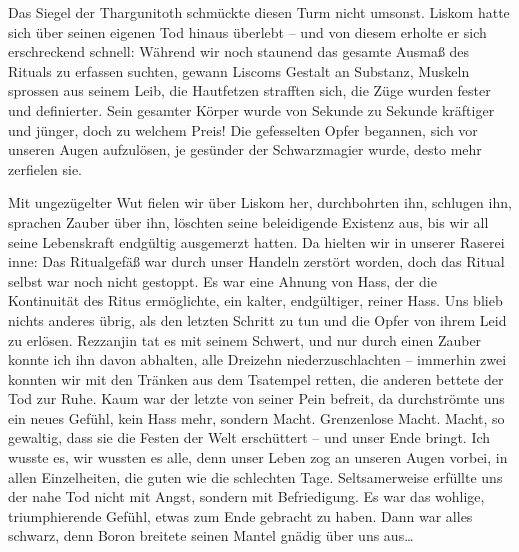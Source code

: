 Das Siegel der Thargunitoth schmückte diesen Turm nicht umsonst. Liskom hatte sich über seinen eigenen Tod hinaus überlebt -- und von diesem erholte er sich erschreckend schnell: Während wir noch staunend das gesamte Ausmaß des Rituals zu erfassen suchten, gewann Liscoms Gestalt an Substanz, Muskeln sprossen aus seinem Leib, die Hautfetzen strafften sich, die Züge wurden fester und definierter. Sein gesamter Körper wurde von Sekunde zu Sekunde kräftiger und jünger, doch zu welchem Preis! Die gefesselten Opfer begannen, sich vor unseren Augen aufzulösen, je gesünder der Schwarzmagier wurde, desto mehr zerfielen sie. \par

Mit ungezügelter Wut fielen wir über Liskom her, durchbohrten ihn, schlugen ihn, sprachen Zauber über ihn, löschten seine beleidigende Existenz aus, bis wir all seine Lebenskraft endgültig ausgemerzt hatten. Da hielten wir in unserer Raserei inne: Das Ritualgefäß war durch unser Handeln zerstört worden, doch das Ritual selbst war noch nicht gestoppt. Es war eine Ahnung von Hass, der die Kontinuität des Ritus ermöglichte, ein kalter, endgültiger, reiner Hass. Uns blieb nichts anderes übrig, als den letzten Schritt zu tun und die Opfer von ihrem Leid zu erlösen. Rezzanjin tat es mit seinem Schwert, und nur durch einen Zauber konnte ich ihn davon abhalten, alle Dreizehn niederzuschlachten -- immerhin zwei konnten wir mit den Tränken aus dem Tsatempel retten, die anderen bettete der Tod zur Ruhe. Kaum war der letzte von seiner Pein befreit, da durchströmte uns ein neues Gefühl, kein Hass mehr, sondern Macht. Grenzenlose Macht. Macht, so gewaltig, dass sie die Festen der Welt erschüttert -- und unser Ende bringt. Ich wusste es, wir wussten es alle, denn unser Leben zog an unseren Augen vorbei, in allen Einzelheiten, die guten wie die schlechten Tage. Seltsamerweise erfüllte uns der nahe Tod nicht mit Angst, sondern mit Befriedigung. Es war das wohlige, triumphierende Gefühl, etwas zum Ende gebracht zu haben. Dann war alles schwarz, denn Boron breitete seinen Mantel gnädig über uns aus…


